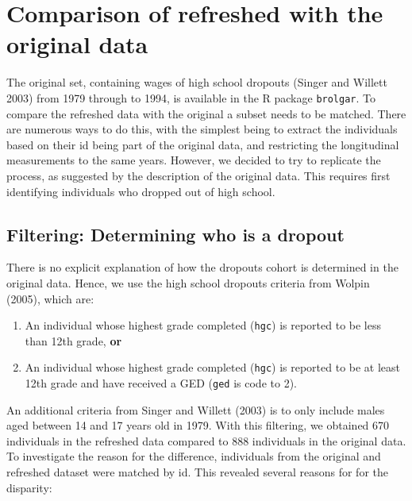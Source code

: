 \documentclass{article}
\providecommand{\tightlist}{%
  \setlength{\itemsep}{0pt}\setlength{\parskip}{0pt}}
\begin{document}
\hypertarget{compare}{%
\section{Comparison of refreshed with the original data}\label{compare}}

The original set, containing wages of high school dropouts (Singer and Willett 2003) from 1979 through to 1994, is available in the R package \texttt{brolgar}. To compare the refreshed data with the original a subset needs to be matched. There are numerous ways to do this, with the simplest being to extract the individuals based on their id being part of the original data, and restricting the longitudinal measurements to the same years. However, we decided to try to replicate the process, as suggested by the description of the original data. This requires first identifying individuals who dropped out of high school.

\hypertarget{filtering-determining-who-is-a-dropout}{%
\subsection{Filtering: Determining who is a dropout}\label{filtering-determining-who-is-a-dropout}}

There is no explicit explanation of how the dropouts cohort is determined in the original data. Hence, we use the high school dropouts criteria from Wolpin (2005), which are:

\begin{enumerate}
\def\labelenumi{\arabic{enumi}.}
\tightlist
\item
  An individual whose highest grade completed (\texttt{hgc}) is reported to be less than 12th grade, \textbf{or}
\item
  An individual whose highest grade completed (\texttt{hgc}) is reported to be at least 12th grade and have received a GED (\texttt{ged} is code to 2).
\end{enumerate}

An additional criteria from Singer and Willett (2003) is to only include males aged between 14 and 17 years old in 1979. With this filtering, we obtained 670 individuals in the refreshed data compared to 888 individuals in the original data. To investigate the reason for the difference, individuals from the original and refreshed dataset were matched by id. This revealed several reasons for for the disparity:
\end{document}
